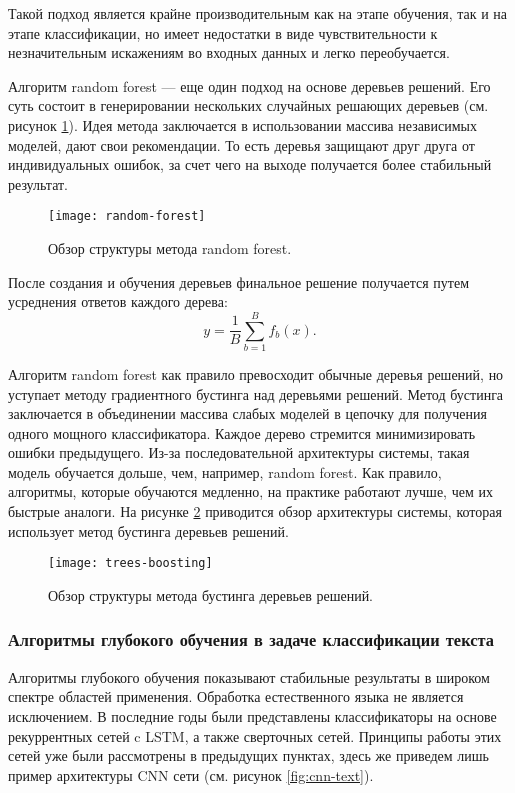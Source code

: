 Такой подход является крайне производительным как на этапе обучения, так и на этапе классификации, но имеет недостатки в виде чувствительности к незначительным искажениям во входных данных и легко переобучается.

Алгоритм random forest\cite{ho1995random} --- еще один подход на основе деревьев решений. Его суть состоит в генерировании нескольких случайных решающих деревьев (см. рисунок \ref{fig:random-forest}). Идея метода заключается в использовании массива независимых моделей, дают свои рекомендации. То есть деревья защищают друг друга от индивидуальных ошибок, за счет чего на выходе получается более стабильный результат.

\begin{figure}[h]
	\centering
	\texttt{[image: random-forest]}
	\caption{Обзор структуры метода random forest.}
	\label{fig:random-forest}
\end{figure}

После создания и обучения деревьев финальное решение получается путем усреднения ответов каждого дерева:
$$y = \frac{1}{B} \sum_{b = 1}^{B} f_b(x).$$

Алгоритм random forest как правило превосходит обычные деревья решений, но уступает методу градиентного бустинга над деревьями решений. Метод бустинга заключается в объединении массива слабых моделей в цепочку для получения одного мощного классификатора. Каждое дерево стремится минимизировать ошибки предыдущего. Из-за последовательной архитектуры системы, такая модель обучается дольше, чем, например, random forest. Как правило, алгоритмы, которые обучаются медленно, на практике работают лучше, чем их быстрые аналоги. На рисунке \ref{fig:trees-boosting} приводится обзор архитектуры системы, которая использует метод бустинга деревьев решений.

\begin{figure}[h]
	\centering
	\texttt{[image: trees-boosting]}
	\caption{Обзор структуры метода бустинга деревьев решений.}
	\label{fig:trees-boosting}
\end{figure}

\subsubsection{Алгоритмы глубокого обучения в задаче классификации текста}
Алгоритмы глубокого обучения показывают стабильные результаты в широком спектре областей применения. Обработка естественного языка не является исключением. В последние годы были представлены классификаторы на основе рекуррентных сетей c LSTM\cite{yogatama2017generative}, а также сверточных сетей\cite{jaderberg2016reading}. Принципы работы этих сетей уже были рассмотрены в предыдущих пунктах, здесь же приведем лишь пример архитектуры CNN сети (см. рисунок \ref{fig:cnn-text}).

